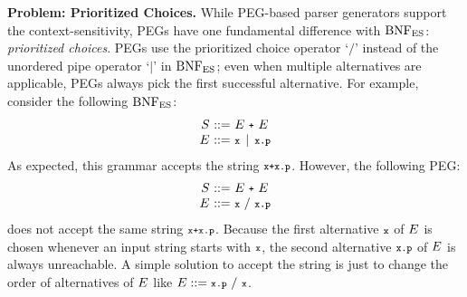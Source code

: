\smallskip

\textbf{Problem: Prioritized Choices.}
While PEG-based parser generators support the context-sensitivity,
PEGs have one fundamental difference with \( \text{BNF}_{\text{ES}} \): \textit{prioritized
choices}.  PEGs use the prioritized choice operator `\( / \)' instead of the unordered
pipe operator `\( \mid \)' in \( \text{BNF}_{\text{ES}} \); even when multiple alternatives are
applicable, PEGs always pick the first successful alternative.  For example,
consider the following \( \text{BNF}_{\text{ES}} \):
\begin{equation}
  \begin{array}{r@{~}c@{~}l}
    \NT{S} &::=& \NT{E} ~ \T{+} ~ \NT{E}\\
    \NT{E} &::=& \T{x} \, \mid\, \T{x} \T{.} \T{p}\\
  \end{array}
  \label{eq:simple-js}
\end{equation}
As expected, this grammar accepts the string \( \texttt{\footnotesize x+x.p} \).
However, the following PEG:
\begin{equation}
  \begin{array}{r@{~}c@{~}l}
    \NT{S} &::=& \NT{E} ~ \T{+} ~ \NT{E}\\
    \NT{E} &::=& \T{x} ~/~ \T{x} \T{.} \T{p}\\
  \end{array}
  \label{eq:simple-js}
\end{equation}
does not accept the same string \( \texttt{\footnotesize x+x.p} \).
Because the first alternative \( \texttt{\footnotesize x} \) of \( E \) is chosen
whenever an input string starts with \( \texttt{\footnotesize x} \),
the second alternative \( \texttt{\footnotesize x}\texttt{\footnotesize.}\texttt{\footnotesize p} \) of \( E \) is always unreachable.
A simple solution to accept the string is just to change the
order of alternatives of \( E \) like \( E ::= \texttt{\footnotesize x} \texttt{\footnotesize.} \texttt{\footnotesize p} ~/~ \texttt{\footnotesize x} \).

